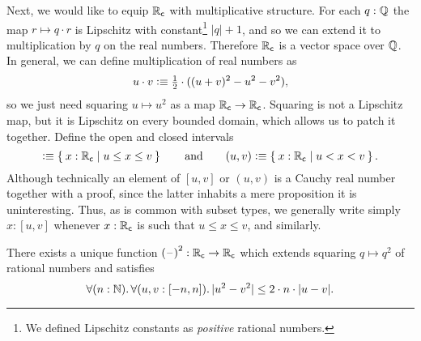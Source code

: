 Next, we would like to equip $\mathbb{R}_\mathsf{c}$ with multiplicative structure. For each $q : \mathbb{Q}$ the
map $r \mapsto q \cdot r$ is Lipschitz with constant\footnote{We defined Lipschitz
  constants as \emph{positive} rational numbers.} $|q| + 1$, and so we can extend it to
multiplication by $q$ on the real numbers. Therefore $\mathbb{R}_\mathsf{c}$ is a vector space over $\mathbb{Q}$.
In general, we can define multiplication of real numbers as
%
\begin{equation}
  u \cdot v \defeq
  {\textstyle \frac{1}{2}} \cdot ((u + v)^2 - u^2 - v^2),\label{mult-from-square}
\end{equation}
%
so we just need squaring $u \mapsto u^2$ as a map $\mathbb{R}_\mathsf{c} \to \mathbb{R}_\mathsf{c}$. Squaring is not a
Lipschitz map, but it is Lipschitz on every bounded domain, which allows us to patch it
together. Define the open and closed intervals
%
\begin{equation*}
  [u,v] \defeq \setof{ x : \RC | u \leq x \leq v }
  \qquad\text{and}\qquad
  (u,v) \defeq \setof{ x : \RC | u < x < v }.
\end{equation*}
%
Although technically an element of $[u,v]$ or $(u,v)$ is a Cauchy real number together with a proof, since the latter inhabits a mere proposition it is uninteresting.
Thus, as is common with subset types, we generally write simply $x:[u,v]$ whenever $x:\mathbb{R}_\mathsf{c}$ is such that $u\leq x \leq v$, and similarly.

\begin{thm} \label{RC-squaring}
  There exists a unique function ${(\mathord{\hspace{1pt}\text{--}\hspace{1pt}})}^2 : \mathbb{R}_\mathsf{c} \to \mathbb{R}_\mathsf{c}$ which extends squaring $q \mapsto
  q^2$ of rational numbers and satisfies
  \begin{equation*}
    \fall{n : \N}
    \fall{u, v : [-n, n]}
    |u^2 - v^2| \leq 2 \cdot n \cdot |u - v|.
  \end{equation*}
\end{thm}

